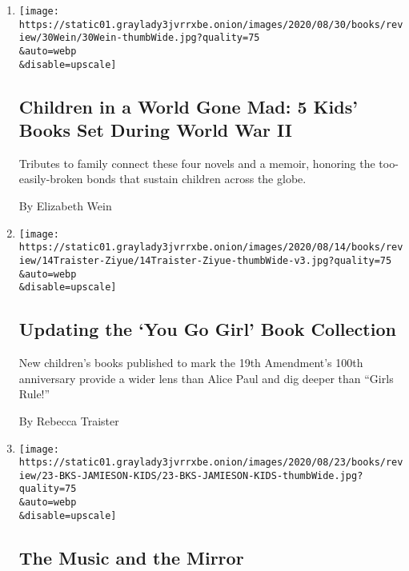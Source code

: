\begin{enumerate}
\def\labelenumi{\arabic{enumi}.}
\item
  \href{/2020/08/28/books/review/war-stories-gordon-korman.html}{}

  \texttt{[image: https://static01.graylady3jvrrxbe.onion/images/2020/08/30/books/review/30Wein/30Wein-thumbWide.jpg?quality=75\\\&auto=webp\\\&disable=upscale]}

  \hypertarget{children-in-a-world-gone-mad-5-kids-books-set-during-world-war-ii}{%
  \subsection{Children in a World Gone Mad: 5 Kids' Books Set During
  World War
  II}\label{children-in-a-world-gone-mad-5-kids-books-set-during-world-war-ii}}

  Tributes to family connect these four novels and a memoir, honoring
  the too-easily-broken bonds that sustain children across the globe.

  By Elizabeth Wein
\item
  \href{/2020/08/17/books/review/19th-amendment-suffrage-womens-right-to-vote.html}{}

  \texttt{[image: https://static01.graylady3jvrrxbe.onion/images/2020/08/14/books/review/14Traister-Ziyue/14Traister-Ziyue-thumbWide-v3.jpg?quality=75\\\&auto=webp\\\&disable=upscale]}

  \hypertarget{updating-the-you-go-girl-book-collection}{%
  \subsection{Updating the `You Go Girl' Book
  Collection}\label{updating-the-you-go-girl-book-collection}}

  New children's books published to mark the 19th Amendment's 100th
  anniversary provide a wider lens than Alice Paul and dig deeper than
  ``Girls Rule!''

  By Rebecca Traister
\item
  \href{/2020/08/15/books/review/hope-larson-all-together-now.html}{}

  \texttt{[image: https://static01.graylady3jvrrxbe.onion/images/2020/08/23/books/review/23-BKS-JAMIESON-KIDS/23-BKS-JAMIESON-KIDS-thumbWide.jpg?quality=75\\\&auto=webp\\\&disable=upscale]}

  \hypertarget{the-music-and-the-mirror}{%
  \subsection{The Music and the Mirror}\label{the-music-and-the-mirror}}


\end{enumerate}
